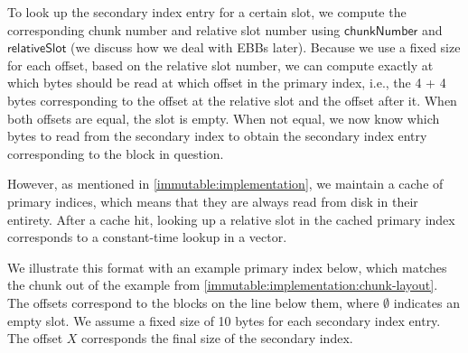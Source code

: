 To look up the secondary index entry for a certain slot, we compute the
corresponding chunk number and relative slot number using $\mathsf{chunkNumber}$
and $\mathsf{relativeSlot}$ (we discuss how we deal with EBBs later). Because we
use a fixed size for each offset, based on the relative slot number, we can
compute exactly at which bytes should be read at which offset in the primary
index, i.e., the 4 + 4 bytes corresponding to the offset at the relative slot
and the offset after it. When both offsets are equal, the slot is empty. When
not equal, we now know which bytes to read from the secondary index to obtain
the secondary index entry corresponding to the block in question.

However, as mentioned in \cref{immutable:implementation}, we maintain a cache of
primary indices, which means that they are always read from disk in their
entirety. After a cache hit, looking up a relative slot in the cached primary
index corresponds to a constant-time lookup in a vector.

We illustrate this format with an example primary index below, which matches the
chunk out of the example from \cref{immutable:implementation:chunk-layout}. The
offsets correspond to the blocks on the line below them, where $\emptyset$ indicates an
empty slot. We assume a fixed size of 10 bytes for each secondary index entry.
The offset $X$ corresponds the final size of the secondary index.

